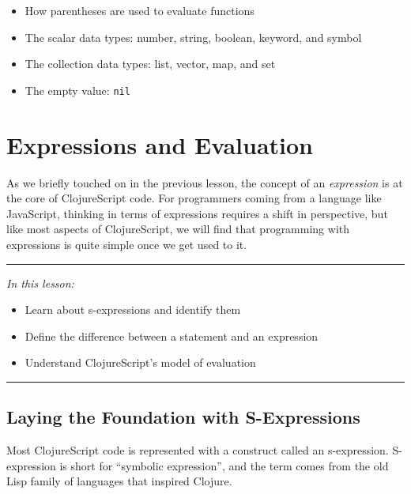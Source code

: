 \documentclass[10pt,twoside,openright]{memoir}
\begin{document}
\begin{itemize}
\tightlist
\item
  How parentheses are used to evaluate functions
\item
  The scalar data types: number, string, boolean, keyword, and symbol
\item
  The collection data types: list, vector, map, and set
\item
  The empty value: \texttt{nil}
\end{itemize}

\chapter{Expressions and Evaluation}

As we briefly touched on in the previous lesson, the concept of an
\emph{expression} is at the core of ClojureScript code. For programmers
coming from a language like JavaScript, thinking in terms of expressions
requires a shift in perspective, but like most aspects of ClojureScript,
we will find that programming with expressions is quite simple once we
get used to it.

\begin{center}\rule{0.5\linewidth}{0.5pt}\end{center}

\emph{In this lesson:}

\begin{itemize}
\tightlist
\item
  Learn about s-expressions and identify them
\item
  Define the difference between a statement and an expression
\item
  Understand ClojureScript's model of evaluation
\end{itemize}

\begin{center}\rule{0.5\linewidth}{0.5pt}\end{center}

\section{Laying the Foundation with S-Expressions}

Most ClojureScript code is represented with a construct called an
s-expression. S-expression is short for ``symbolic expression'', and the
term comes from the old Lisp family of languages that inspired Clojure.
\end{document}
